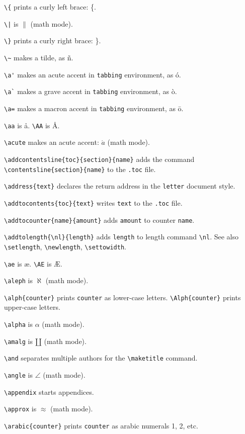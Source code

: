 \verb"\{" prints a curly left brace: \{.

\verb"\|" is $\|$ (math mode).

\verb"\}" prints a curly right brace: \}.

\verb"\~" makes a tilde, as \~n.

\verb"\a'" makes an acute accent in \verb"tabbing" environment, as \'o.

\verb"\a`" makes a grave accent in \verb"tabbing" environment, as \`o.

\verb"\a=" makes a macron accent in \verb"tabbing" environment, as \=o.

\verb"\aa" is \aa. \verb"\AA" is \AA.

\verb"\acute" makes an acute accent: $\acute a$ (math mode).

\verb"\addcontentsline{toc}{section}{name}" adds the command
	\verb"\contentsline{section}{name}" to the \verb".toc" file.

\verb"\address{text}" declares the return address in the \verb"letter"
	document style.

\verb"\addtocontents{toc}{text}" writes \verb"text" to the \verb".toc" file.

\verb"\addtocounter{name}{amount}" adds \verb"amount" to counter \verb"name".

\verb"\addtolength{\nl}{length}" adds \verb"length" to length command
	\verb"\nl". See also \verb"\setlength", \verb"\newlength",
	\verb"\settowidth".

\verb"\ae" is \ae.  \verb"\AE" is \AE.

\verb"\aleph" is $\aleph$ (math mode).

\verb"\alph{counter}" prints \verb"counter" as lower-case letters.
	\verb"\Alph{counter}" prints upper-case letters.

\verb"\alpha" is $\alpha$ (math mode).

\verb"\amalg" is $\amalg$ (math mode).

\verb"\and" separates multiple authors for the \verb"\maketitle" command.

\verb"\angle" is $\angle$ (math mode).

\verb"\appendix" starts appendices.

\verb"\approx" is $\approx$ (math mode).

\verb"\arabic{counter}" prints \verb"counter" as arabic numerals 1, 2, etc.

